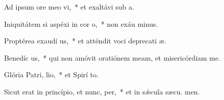 \item Ad ipsum ore meo vi,~* et exaltávi sub  a.
\item Iniquitátem si aspéxi in cor o,~* non exáu minus.
\item Proptérea exaudí us,~* et atténdit voci deprecati æ.
\item Benedíc us,~* qui non amóvit oratiónem meam, et misericórdiam   me.
\item Glória Patri,  lio,~* et Spirí to.
\item Sicut erat in princípio, et nunc,  per,~* et in sǽcula sæcu. men.
